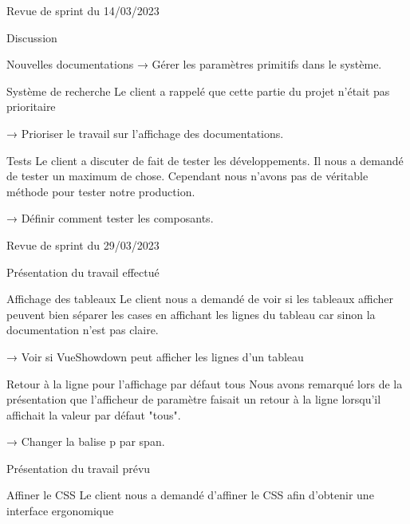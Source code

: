 \documentclass[]{article}
\begin{document}
{\begin{section}{Revue de sprint du 14/03/2023}
\begin{subsection}{Discussion}
\begin{subsubsection}{Nouvelles documentations}
         → Gérer les paramètres primitifs dans le système.
     \end{subsubsection}

     \begin{subsubsection}{Système de recherche}
         Le client a rappelé que cette partie du projet n’était pas prioritaire

         → Prioriser le travail sur l’affichage des documentations.
     \end{subsubsection}

     \begin{subsubsection}{Tests}
         Le client a discuter de fait de tester les développements. Il nous a demandé de tester un maximum de chose. Cependant nous n’avons pas de véritable méthode pour tester notre production.

         → Définir comment tester les composants.
     \end{subsubsection}
 \end{subsection}
\end{section}

\begin{section}{Revue de sprint du 29/03/2023}
 \begin{subsection}{Présentation du travail effectué}
     \begin{subsubsection}{Affichage des tableaux}
         Le client nous a demandé de voir si les tableaux afficher peuvent bien séparer les cases en affichant les lignes du tableau car sinon la documentation n’est pas claire.

         → Voir si VueShowdown peut afficher les lignes d’un tableau
     \end{subsubsection}

     \begin{subsubsection}{Retour à la ligne pour l’affichage par défaut tous}
         Nous avons remarqué lors de la présentation que l’afficheur de paramètre faisait un retour à la ligne lorsqu’il affichait la valeur par défaut "tous".

         → Changer la balise p par span.
     \end{subsubsection}
 \end{subsection}

 \newpage

 \begin{subsection}{Présentation du travail prévu}
     \begin{subsubsection}{Affiner le CSS}
         Le client nous a demandé d’affiner le CSS afin d’obtenir une interface ergonomique


\end{subsubsection}
\end{subsection}
\end{section}}
\end{document}
